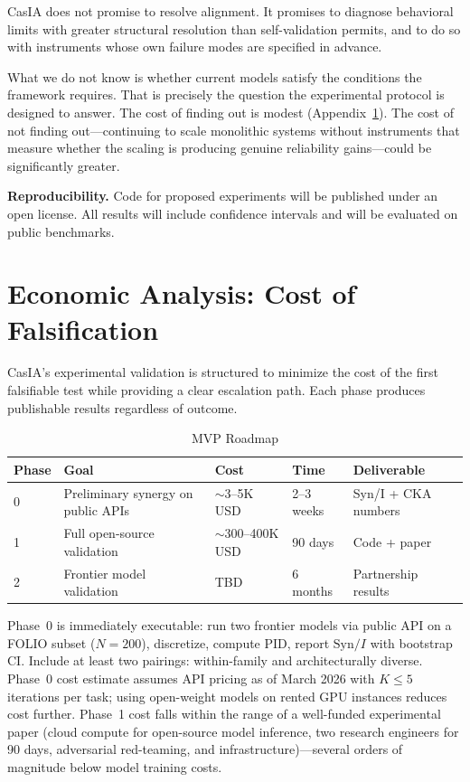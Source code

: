 \documentclass[11pt,a4paper]{article}
\theoremstyle{definition}
\begin{document}
CasIA does not promise to resolve alignment. It promises to diagnose behavioral limits with greater structural resolution than self-validation permits, and to do so with instruments whose own failure modes are specified in advance.

What we do not know is whether current models satisfy the conditions the framework requires. That is precisely the question the experimental protocol is designed to answer. The cost of finding out is modest (Appendix~\ref{app:economics}). The cost of not finding out---continuing to scale monolithic systems without instruments that measure whether the scaling is producing genuine reliability gains---could be significantly greater.

\medskip
\noindent\textbf{Reproducibility.} Code for proposed experiments will be published under an open license. All results will include confidence intervals and will be evaluated on public benchmarks.


\appendix

\section{Economic Analysis: Cost of Falsification}
\label{app:economics}

CasIA's experimental validation is structured to minimize the cost of the first falsifiable test while providing a clear escalation path. Each phase produces publishable results regardless of outcome.

\begin{table}[ht]
\centering
\caption{MVP Roadmap}
\label{tab:roadmap}
\begin{tabular}{@{}lllll@{}}
\toprule
\textbf{Phase} & \textbf{Goal} & \textbf{Cost} & \textbf{Time} & \textbf{Deliverable} \\
\midrule
0 & Preliminary synergy on public APIs & $\sim$3--5K USD & 2--3 weeks & Syn/I + CKA numbers \\
1 & Full open-source validation & $\sim$300--400K USD & 90 days & Code + paper \\
2 & Frontier model validation & TBD & 6 months & Partnership results \\
\bottomrule
\end{tabular}
\end{table}

Phase~0 is immediately executable: run two frontier models via public API on a FOLIO subset ($N=200$), discretize, compute PID, report $\mathrm{Syn}/I$ with bootstrap CI. Include at least two pairings: within-family and architecturally diverse. Phase~0 cost estimate assumes API pricing as of March 2026 with $K \leq 5$ iterations per task; using open-weight models on rented GPU instances reduces cost further. Phase~1 cost falls within the range of a well-funded experimental paper (cloud compute for open-source model inference, two research engineers for 90 days, adversarial red-teaming, and infrastructure)---several orders of magnitude below model training costs.
\end{document}
